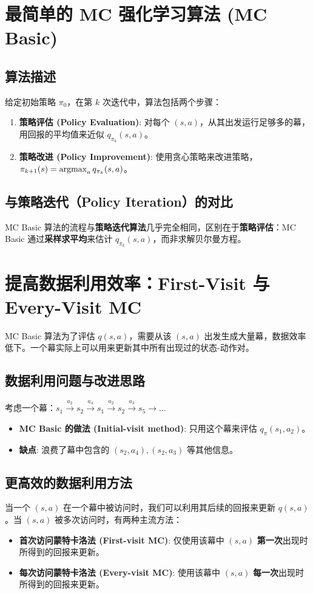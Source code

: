 \documentclass[12pt, a4paper]{article}
\newcommand{\argmax}{\operatornamewithlimits{argmax}} %
\begin{document}
\section{最简单的 MC 强化学习算法 (MC Basic)}
\subsection{算法描述}
给定初始策略 $\pi_0$，在第 $k$ 次迭代中，算法包括两个步骤：
\begin{enumerate}[label=\textbf{Step \arabic*}:, wide, labelwidth=!, labelindent=0pt]
    \item \textbf{策略评估 (Policy Evaluation)}: 对每个 $(s,a)$，从其出发运行足够多的幕，用回报的平均值来近似 $q_{\pi_k}(s, a)$。
    \item \textbf{策略改进 (Policy Improvement)}: 使用贪心策略来改进策略，$\pi_{k+1}(s) = \argmax_{a} q_{\pi_k}(s, a)$。
\end{enumerate}

\subsection{与策略迭代（Policy Iteration）的对比}
MC Basic 算法的流程与\textbf{策略迭代算法}几乎完全相同，区别在于\textbf{策略评估}：MC Basic 通过\textbf{采样求平均}来估计 $q_{\pi_k}(s, a)$，而非求解贝尔曼方程。


\section{提高数据利用效率：First-Visit 与 Every-Visit MC}
MC Basic 算法为了评估 $q(s,a)$，需要从该 $(s,a)$ 出发生成大量幕，数据效率低下。一个幕实际上可以用来更新其中所有出现过的状态-动作对。

\subsection{数据利用问题与改进思路}
考虑一个幕：$s_1 \xrightarrow{a_2} s_2 \xrightarrow{a_4} s_1 \xrightarrow{a_2} s_2 \xrightarrow{a_3} s_5 \to \dots$
\begin{itemize}
    \item \textbf{MC Basic 的做法 (Initial-visit method)}: 只用这个幕来评估 $q_\pi(s_1, a_2)$。
    \item \textbf{缺点}: 浪费了幕中包含的 $(s_2, a_4), (s_2, a_3)$ 等其他信息。
\end{itemize}

\subsection{更高效的数据利用方法}
当一个 $(s,a)$ 在一个幕中被访问时，我们可以利用其后续的回报来更新 $q(s,a)$。当 $(s,a)$ 被多次访问时，有两种主流方法：
\begin{itemize}
    \item \textbf{首次访问蒙特卡洛法 (First-visit MC)}: 仅使用该幕中 $(s,a)$ \textbf{第一次}出现时所得到的回报来更新。
    \item \textbf{每次访问蒙特卡洛法 (Every-visit MC)}: 使用该幕中 $(s,a)$ \textbf{每一次}出现时所得到的回报来更新。
\end{itemize}
\end{document}

